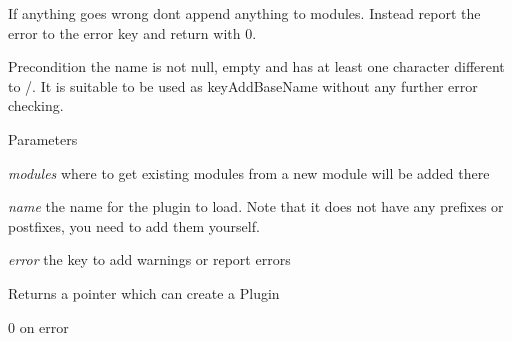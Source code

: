 If anything goes wrong dont append anything to modules. Instead report the error to the error key and return with 0.

\begin{DoxyPrecond}{Precondition}
the name is not null, empty and has at least one character different to /. It is suitable to be used as keyAddBaseName without any further error checking.
\end{DoxyPrecond}

\begin{DoxyParams}{Parameters}
\item[{\em modules}]where to get existing modules from a new module will be added there \item[{\em name}]the name for the plugin to load. Note that it does not have any prefixes or postfixes, you need to add them yourself. \item[{\em error}]the key to add warnings or report errors \end{DoxyParams}
\begin{DoxyReturn}{Returns}
a pointer which can create a Plugin 

0 on error 
\end{DoxyReturn}

